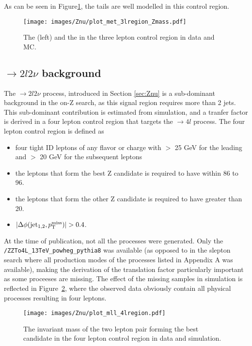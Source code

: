 As can be seen in Figure\ref{fig:WZmetOnZ}, the \ptmiss tails are well modelled in this control region.
\begin{figure}[htbp!]
\begin{center}
\texttt{[image: images/Znu/plot\_met\_3lregion\_Zmass.pdf]}
\caption{The \ptmiss (left) and the \mttwo in the three lepton control region in data and MC. }
\label{fig:WZmetOnZ}
\end{center}
\end{figure}
\subsection*{\PZZ$\rightarrow2l2\nu$ background}
\noindent
The \PZZ$\rightarrow 2l2\nu$ process, introduced in Section \ref{sec:Znu} is a sub-dominant background in the on-Z search, as this signal region requires more than 2 jets.
This sub-dominant contribution is estimated from simulation, and a tranfer factor is derived in a four lepton control region that targets the \PZZ$\rightarrow4l$ process. 
The four lepton control region is defined as
\begin{itemize}
    \item four tight ID leptons of any flavor or charge with \pt $>$ 25 GeV for the leading and \pt $>$ 20 GeV for the subsequent leptons
    \item the leptons that form the best Z candidate is required to have \mll within 86 to 96\GeV.
    \item the leptons that form the other Z candidate is required to have \mll greater than 20\GeV.
    \item $|\Delta\phi(\mathrm{jet_{1,2}}, \ptmiss)|>0.4$.
\end{itemize}
At the time of publication, not all the \PZZ processes were generated.
\noindent
\justify
Only the \texttt{/ZZTo4L\_13TeV\_powheg\_pythia8} was available (as opposed to in the slepton search where all production modes of the \PZZ processes listed in Appendix A was available), making the derivation of the translation factor particularly important as some proceeses are missing.
The effect of the missing samples in simulation is reflected in Figure~\ref{fig:ZZonZ}, where the observed data obviously contain all physical processes resulting in four leptons.
\begin{figure}[htbp!]
\begin{center}
\texttt{[image: images/Znu/plot\_mll\_4lregion.pdf]}
\caption{The invariant mass of the two lepton pair forming the best \PZ candidate in the four lepton control region in data and simulation.}
\label{fig:ZZonZ}
\end{center}
\end{figure}
